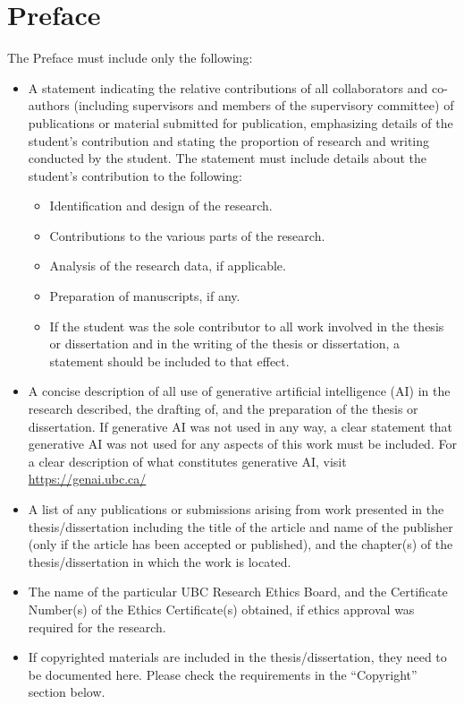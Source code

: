 \documentclass[msc,oneside]{ubcthesis}%
\begin{document}
\renewcommand{\abstractname}{Lay Summary}

\begin{abstract}
Effective January 2018, all theses and dissertations must include a lay summary. The lay summary explains the key goals and contributions of the research/scholarly work in terms that can be understood by the general public. It does not use technical terms and discipline-specific language. It must not exceed 150 words in length.
\end{abstract}

\chapter{Preface}
The Preface must include only the following:
\begin{itemize}
    \item A statement indicating the relative contributions of all collaborators and co-authors (including supervisors and members of the supervisory committee) of publications or material submitted for publication, emphasizing details of the student’s contribution and stating the proportion of research and writing conducted by the student. The statement must include details about the student’s contribution to the following:
    \begin{itemize}
        \item Identification and design of the research.
        \item Contributions to the various parts of the research.
        \item Analysis of the research data, if applicable.
        \item Preparation of manuscripts, if any.
        \item If the student was the sole contributor to all work involved in the thesis or dissertation and in the writing of the thesis or dissertation, a statement should be included to that effect.
    \end{itemize}
    \item A concise description of all use of generative artificial intelligence (AI)  in the research described, the drafting of, and the preparation of the thesis or dissertation.  If generative AI was not used in any way, a clear statement that generative AI was not used for any aspects of this work must be included. For a clear description of what constitutes generative AI, visit \url{https://genai.ubc.ca/}
    \item A list of any publications or submissions arising from work presented in the thesis/dissertation including the title of the article and name of the publisher (only if the article has been accepted or published), and the chapter(s) of the thesis/dissertation in which the work is located.
    \item The name of the particular UBC Research Ethics Board, and the Certificate Number(s) of the Ethics Certificate(s) obtained, if ethics approval was required for the research.
    \item If copyrighted materials are included in the thesis/dissertation, they need to be documented here. Please check the requirements in the “Copyright” section below.
\end{itemize}
\end{document}
